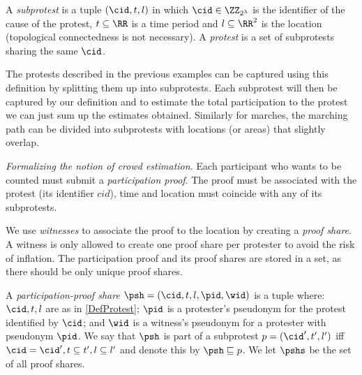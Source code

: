 
\begin{definition}[Protest]\label{DefProtest}
  A \emph{subprotest} is a tuple \((\cid, t, l)\) in which \(\cid\in 
    \ZZ_{2^\lambda}\) is the identifier of the cause of the protest,
  \(t \subseteq \RR\) is a time period and \(l \subseteq \RR^2\) is the location 
  (topological connectedness is not necessary).
  A \emph{protest} is a set of subprotests sharing the same \(\cid\).
\end{definition}

The protests described in the previous examples can be captured using this definition by splitting 
them up into subprotests.
Each subprotest will then be captured by our definition and to estimate the total participation to the protest we can just sum up the estimates obtained.
Similarly for marches, the marching path can be divided into subprotests with 
locations (or areas) that slightly overlap.

\emph{Formalizing the notion of crowd estimation.} Each participant who wants to 
be counted must submit a \emph{participation proof}.
The proof must be associated with the protest (\ie its identifier \(cid\)), time and location must coincide with any of its subprotests.

We use \emph{witnesses} to associate the proof to the location by creating a 
\emph{proof share}.
A witness is only allowed to create one proof share per protester to avoid the 
risk of inflation.
The participation proof and its proof shares are stored in a set, as there should be only unique proof shares.


\begin{definition}
  A \emph{participation-proof share} \(\psh = (\cid, t, l, \pid, \wid)\) is a 
  tuple where:
  \(\cid, t, l\) are as in \cref{DefProtest};
  \(\pid\) is a protester's pseudonym for the protest identified by \(\cid\); 
  and
  \(\wid\) is a witness's pseudonym for a protester with pseudonym \(\pid\).
  We say that \(\psh\) is part of a subprotest \(p = (\cid', t', l')\) iff 
  \(\cid = \cid', t\subseteq t', l\subseteq l'\) and denote this by \(\psh 
    \sqsubseteq p\).
  We let \(\pshs\) be the set of all proof shares.
\end{definition}

